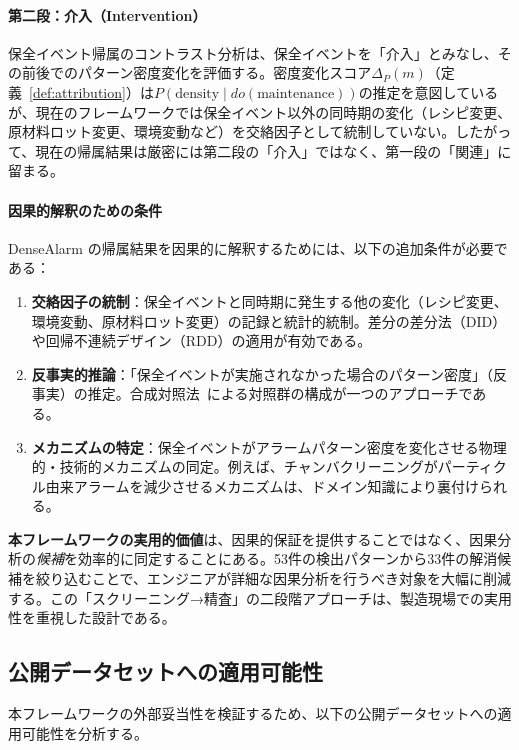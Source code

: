 \documentclass[11pt]{article}
\begin{document}
\paragraph{第二段：介入（Intervention）}
保全イベント帰属のコントラスト分析は、保全イベントを「介入」とみなし、その前後でのパターン密度変化を評価する。密度変化スコア$\Delta_P(m)$（定義~\ref{def:attribution}）は$P(\text{density} \mid do(\text{maintenance}))$の推定を意図しているが、現在のフレームワークでは保全イベント以外の同時期の変化（レシピ変更、原材料ロット変更、環境変動など）を交絡因子として統制していない。したがって、現在の帰属結果は厳密には第二段の「介入」ではなく、第一段の「関連」に留まる。

\paragraph{因果的解釈のための条件}
DenseAlarm の帰属結果を因果的に解釈するためには、以下の追加条件が必要である：
\begin{enumerate}
  \item \textbf{交絡因子の統制}：保全イベントと同時期に発生する他の変化（レシピ変更、環境変動、原材料ロット変更）の記録と統計的統制。差分の差分法（DID）や回帰不連続デザイン（RDD）の適用が有効である。
  \item \textbf{反事実的推論}：「保全イベントが実施されなかった場合のパターン密度」（反事実）の推定。合成対照法~\citep{abadie2010synth}による対照群の構成が一つのアプローチである。
  \item \textbf{メカニズムの特定}：保全イベントがアラームパターン密度を変化させる物理的・技術的メカニズムの同定。例えば、チャンバクリーニングがパーティクル由来アラームを減少させるメカニズムは、ドメイン知識により裏付けられる。
\end{enumerate}

\textbf{本フレームワークの実用的価値}は、因果的保証を提供することではなく、因果分析の\emph{候補}を効率的に同定することにある。53件の検出パターンから33件の解消候補を絞り込むことで、エンジニアが詳細な因果分析を行うべき対象を大幅に削減する。この「スクリーニング→精査」の二段階アプローチは、製造現場での実用性を重視した設計である。

\subsection{公開データセットへの適用可能性}\label{sec:public-data}

本フレームワークの外部妥当性を検証するため、以下の公開データセットへの適用可能性を分析する。
\end{document}
